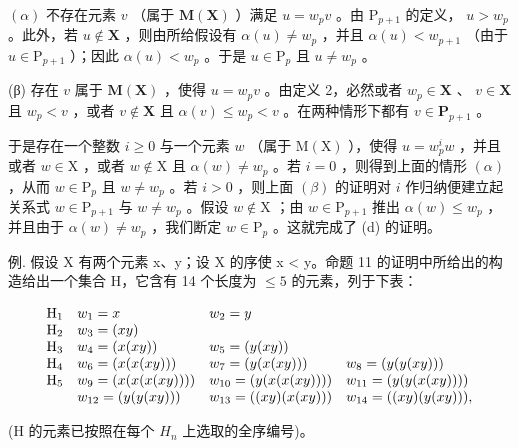 \((\alpha)\) 不存在元素 \(v\) （属于 \(\mathbf{M}(\mathbf{X})\) ）满足 \(u = w_{p}v\) 。由 \(\mathrm{P}_{p + 1}\) 的定义， \(u > w_{p}\) 。此外，若 \(u\notin \mathbf{X}\) ，则由所给假设有 \(\alpha (u)\neq w_p\) ，并且 \(\alpha (u) < w_{p + 1}\) （由于 \(u\in \mathrm{P}_{p + 1}\) ）；因此 \(\alpha (u) < w_{p}\) 。于是 \(u\in \mathrm{P}_p\) 且 \(u\neq w_{p}\) 。

(β) 存在 \(v\) 属于 \(\mathbf{M}(\mathbf{X})\) ，使得 \(u = w_{p}v\) 。由定义 2，必然或者 \(w_{p} \in \mathbf{X}\) 、 \(v \in \mathbf{X}\) 且 \(w_{p} < v\) ，或者 \(v \notin \mathbf{X}\) 且 \(\alpha(v) \leqslant w_{p} < v\) 。在两种情形下都有 \(v \in \mathbf{P}_{p+1}\) 。

于是存在一个整数 \(i \geqslant 0\) 与一个元素 \(w\) （属于 \(\mathrm{M}(\mathrm{X})\) ），使得 \(u = w_p^i w\) ，并且或者 \(w \in \mathrm{X}\) ，或者 \(w \notin \mathrm{X}\) 且 \(\alpha(w) \neq w_p\) 。若 \(i = 0\) ，则得到上面的情形 \((\alpha)\) ，从而 \(w \in \mathrm{P}_p\) 且 \(w \neq w_p\) 。若 \(i > 0\) ，则上面 \((\beta)\) 的证明对 \(i\) 作归纳便建立起关系式 \(w \in \mathrm{P}_{p+1}\) 与 \(w \neq w_p\) 。假设 \(w \notin \mathrm{X}\) ；由 \(w \in \mathrm{P}_{p+1}\) 推出 \(\alpha(w) \leqslant w_p\) ，并且由于 \(\alpha(w) \neq w_p\) ，我们断定 \(w \in \mathrm{P}_p\) 。这就完成了 (d) 的证明。

例. 假设 X 有两个元素 x、y；设 X 的序使 x < y。命题 11 的证明中所给出的构造给出一个集合 H，它含有 14 个长度为 \(\leqslant 5\) 的元素，列于下表：

\[
\begin{array}{l l l l} \mathrm{H} _ {1} & w _ {1} = x & w _ {2} = y \\ \mathrm{H} _ {2} & w _ {3} = (x y) \\ \mathrm{H} _ {3} & w _ {4} = (x (x y)) & w _ {5} = (y (x y)) \\ \mathrm{H} _ {4} & w _ {6} = (x (x (x y))) & w _ {7} = (y (x (x y))) & w _ {8} = (y (y (x y))) \\ \mathrm{H} _ {5} & w _ {9} = (x (x (x (x y)))) & w _ {10} = (y (x (x (x y)))) & w _ {11} = (y (y (x (x y)))) \\ & w _ {12} = (y (y (x y))) & w _ {13} = ((x y) (x (x y))) & w _ {14} = ((x y) (y (x y))), \end{array}
\]

(H 的元素已按照在每个 \(H_{n}\) 上选取的全序编号)。

